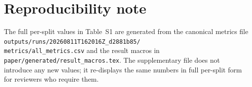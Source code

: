\documentclass[conference]{IEEEtran}
\begin{document}
\section*{Reproducibility note}

The full per-split values in Table~S1 are generated from the canonical metrics file \texttt{outputs/runs/20260811T162016Z\_d2881b85/\\metrics/all\_metrics.csv} and the result macros in \texttt{paper/generated/result\_macros.tex}. The supplementary file does not introduce any new values; it re-displays the same numbers in full per-split form for reviewers who require them.
\end{document}
